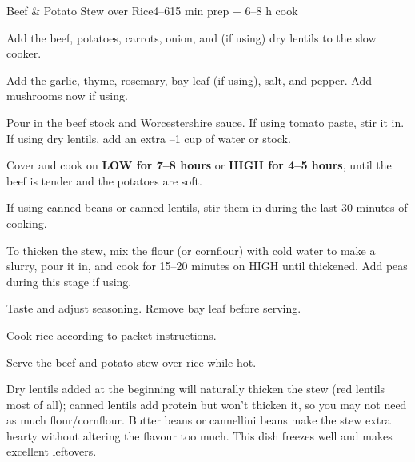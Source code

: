 \begin{recipebox}{Beef \& Potato Stew over Rice}{4--6}{15 min prep + 6--8 h cook}
  \begin{method}
    \item Add the beef, potatoes, carrots, onion, and (if using) dry lentils to the slow cooker.
    \item Add the garlic, thyme, rosemary, bay leaf (if using), salt, and pepper. Add mushrooms now if using.
    \item Pour in the beef stock and Worcestershire sauce. If using tomato paste, stir it in. If using dry lentils, add an extra --1 cup of water or stock.
    \item Cover and cook on \textbf{LOW for 7--8 hours} or \textbf{HIGH for 4--5 hours}, until the beef is tender and the potatoes are soft.
    \item If using canned beans or canned lentils, stir them in during the last 30 minutes of cooking.
    \item To thicken the stew, mix the flour (or cornflour) with cold water to make a slurry, pour it in, and cook for 15--20 minutes on HIGH until thickened. Add peas during this stage if using.
    \item Taste and adjust seasoning. Remove bay leaf before serving.
    \item Cook rice according to packet instructions.
    \item Serve the beef and potato stew over rice while hot.
  \end{method}

  \begin{notes}
    Dry lentils added at the beginning will naturally thicken the stew (red lentils most of all); canned lentils add protein but won't thicken it, so you may not need as much flour/cornflour.
    Butter beans or cannellini beans make the stew extra hearty without altering the flavour too much.
    This dish freezes well and makes excellent leftovers.
  \end{notes}
\end{recipebox}

